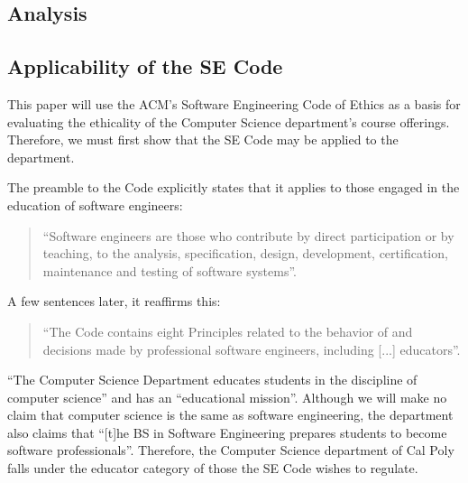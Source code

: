 \documentclass[11pt]{article}
\begin{document}
\begin{multicols}{2}
\section{Analysis}

\subsection{Applicability of the SE Code}

This paper will use the ACM's Software Engineering Code of Ethics as a basis for evaluating the ethicality of the Computer Science department's course offerings.  Therefore, we must first show that the SE Code may be applied to the department.

The preamble to the Code explicitly states that it applies to those engaged in the education of software engineers:

\begin{quote}
``Software engineers are those who contribute by direct participation or by teaching, to the analysis, specification, design, development, certification, maintenance and testing of software systems''. \cite{secode}
\end{quote}

A few sentences later, it reaffirms this:

\begin{quote}
``The Code contains eight Principles related to the behavior of and decisions made by professional software engineers, including [...] educators''. \cite{secode}
\end{quote}


``The Computer Science Department educates students in the discipline of computer science'' and has an ``educational mission''. \cite{catalogDept}  Although we will make no claim that computer science is the same as software engineering, the department also claims that ``[t]he BS in Software Engineering prepares students to become software professionals''. \cite{catalogDept}  Therefore, the Computer Science department of Cal Poly falls under the educator category of those the SE Code wishes to regulate.


\end{multicols}
\end{document}
